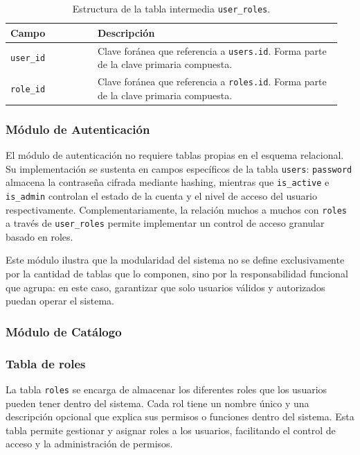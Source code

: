 \begin{table}[H]
	\centering
	\begin{tabular}{|p{0.25\linewidth}|p{0.7\linewidth}|}
		\hline
		\textbf{Campo} & \textbf{Descripción} \\
		\hline
		\texttt{user\_id} & Clave foránea que referencia a \texttt{users.id}. 
		Forma parte de la clave primaria compuesta. \\
		\hline
		\texttt{role\_id} & Clave foránea que referencia a \texttt{roles.id}. 
		Forma parte de la clave primaria compuesta. \\
		\hline
	\end{tabular}
	\caption{Estructura de la tabla intermedia \texttt{user\_roles}.}
	\label{tab:tabla_user_roles}
\end{table}

\subsubsection{Módulo de Autenticación}

El módulo de autenticación no requiere tablas propias en el esquema relacional. 
Su implementación se sustenta en campos específicos de la tabla \texttt{users}: 
\texttt{password} almacena la contraseña cifrada mediante hashing, mientras que 
\texttt{is\_active} e \texttt{is\_admin} controlan el estado de la cuenta y el 
nivel de acceso del usuario respectivamente. Complementariamente, la relación 
muchos a muchos con \texttt{roles} a través de \texttt{user\_roles} permite 
implementar un control de acceso granular basado en roles.

Este módulo ilustra que la modularidad del sistema no se define exclusivamente 
por la cantidad de tablas que lo componen, sino por la responsabilidad funcional 
que agrupa: en este caso, garantizar que solo usuarios válidos y autorizados 
puedan operar el sistema.

\subsubsection{Módulo de Catálogo}

\subsubsection*{Tabla de roles}

La tabla \texttt{roles} se encarga de almacenar los diferentes roles que los usuarios pueden tener dentro del sistema. Cada rol tiene un nombre único y una descripción opcional que explica sus permisos o funciones dentro del sistema. Esta tabla permite gestionar y asignar roles a los usuarios, facilitando el control de acceso y la administración de permisos.

